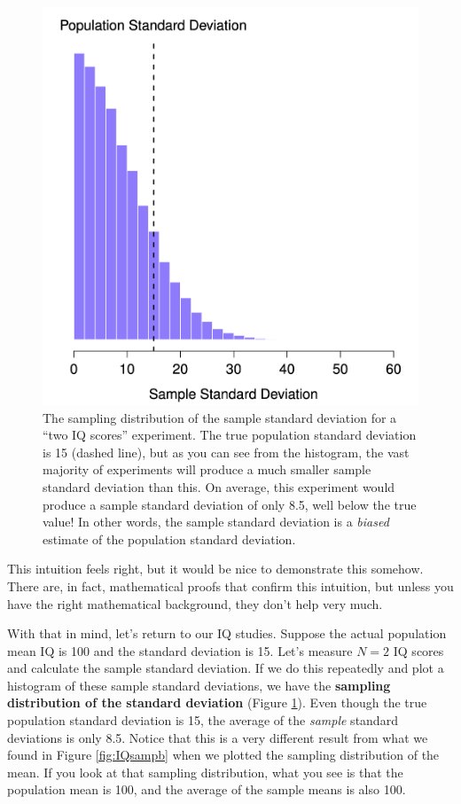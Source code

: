 \documentclass[
]{book}
\theoremstyle{definition}
\theoremstyle{definition}
\theoremstyle{definition}
\theoremstyle{definition}
\theoremstyle{remark}
\begin{document}
\begin{figure}

{\centering \includegraphics[width=0.66\linewidth]{resources/image/samplingDistSampleSD} 

}

\caption{The sampling distribution of the sample standard deviation for a ``two IQ scores'' experiment. The true population standard deviation is 15 (dashed line), but as you can see from the histogram, the vast majority of experiments will produce a much smaller sample standard deviation than this. On average, this experiment would produce a sample standard deviation of only 8.5, well below the true value! In other words, the sample standard deviation is a \emph{biased} estimate of the population standard deviation.}\label{fig:sampdistsd}
\end{figure}

This intuition feels right, but it would be nice to demonstrate this somehow. There are, in fact, mathematical proofs that confirm this intuition, but unless you have the right mathematical background, they don't help very much.

With that in mind, let's return to our IQ studies. Suppose the actual population mean IQ is 100 and the standard deviation is 15. Let's measure \(N=2\) IQ scores and calculate the sample standard deviation. If we do this repeatedly and plot a histogram of these sample standard deviations, we have the \textbf{sampling distribution of the standard deviation} (Figure \ref{fig:sampdistsd}). Even though the true population standard deviation is 15, the average of the \emph{sample} standard deviations is only 8.5. Notice that this is a very different result from what we found in Figure \ref{fig:IQsampb} when we plotted the sampling distribution of the mean. If you look at that sampling distribution, what you see is that the population mean is 100, and the average of the sample means is also 100.
\end{document}
